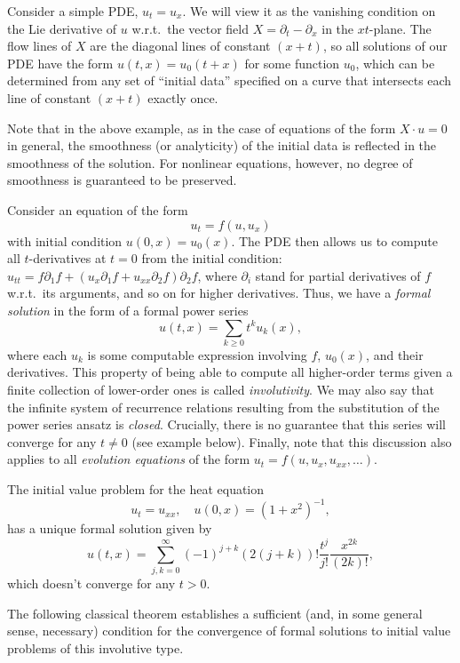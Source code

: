 Consider a simple PDE, $u_t=u_x$. We will view it as the vanishing condition on the Lie derivative of $u$ w.r.t.\ the vector field $X=\partial_t-\partial_x$ in the $xt$-plane. The flow lines of $X$ are the diagonal lines of constant $(x+t)$, so all solutions of our PDE have the form $u(t,x)=u_0(t+x)$ for some function $u_0$, which can be determined from any set of ``initial data'' specified on a curve that intersects each line of constant $(x+t)$ exactly once. 

Note that in the above example, as in the case of equations of the form $X\cdot u=0$ in general, the smoothness (or analyticity) of the initial data is reflected in the smoothness of the solution. For nonlinear equations, however, no degree of smoothness is guaranteed to be preserved. 

Consider an equation of the form 
\[u_t=f(u,u_x)\] 
with initial condition $u(0,x)=u_0(x)$. The PDE then allows us to compute all $t$-derivatives at $t=0$ from the initial condition: $u_{tt}=f\partial_1f+(u_x\partial_1 f+u_{xx}\partial_2f)\partial_2f$, where $\partial_i$ stand for partial derivatives of $f$ w.r.t.\ its arguments, and so on for higher derivatives. Thus, we have a \emph{formal solution} in the form of a formal power series 
\[u(t,x)=\sum_{k\geq 0}t^k u_k(x),\]
where each $u_k$ is some computable expression involving $f$, $u_0(x)$, and their derivatives. This property of being able to compute all higher-order terms given a finite collection of lower-order ones is called \emph{involutivity}. We may also say that the infinite system of recurrence relations resulting from the substitution of the power series ansatz is \emph{closed}.
Crucially, there is no guarantee that this series will converge for any $t\neq 0$ (see example below). Finally, note that this discussion also applies to all \emph{evolution equations} of the form $u_t=f(u,u_x,u_{xx},\ldots)$.

\begin{example}\label{example heat equation}
    The initial value problem for the heat equation 
    \[u_t=u_{xx},\quad u(0,x)=(1+x^2)^{-1},\] 
    has a unique formal solution given by 
    \[u(t,x)=\sum_{j,k=0}^\infty (-1)^{j+k}(2(j+k))!\frac{t^j}{j!}\frac{x^{2k}}{(2k)!},\]
    which doesn't converge for any $t>0$.
\end{example}

The following classical theorem establishes a sufficient (and, in some general sense, necessary) condition for the convergence of formal solutions to initial value problems of this involutive type.

